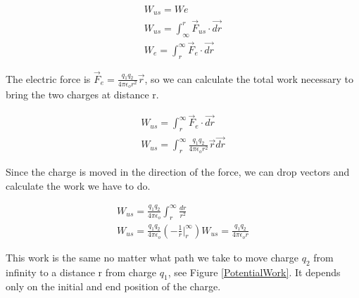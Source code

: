 \documentclass{ximera}
\begin{document}
\begin{eqnarray}
W_{us}=W{e} \\
W_{us}= \int_{\infty}^{r} \vec{F}_{us} \cdot \vec{dr} \\
W_{e}=  \int_{r}^{\infty} \vec{F}_{e} \cdot \vec{dr} 
\end{eqnarray}

The electric force is $\vec{F}_e=\frac{q_1 q_2}{4 \pi \epsilon_o r^2} \vec{r}$, so we can calculate the total work necessary to bring the two charges at distance r.

\begin{eqnarray}
W_{us}= \int_{r}^{\infty} \vec{F}_{e} \cdot \vec{dr} \\
W_{us}= \int_{r}^{\infty} \frac{q_1 q_2}{4 \pi \epsilon_o r^2} \vec{r} \vec{dr}
\end{eqnarray}

Since the charge is moved in the direction of the force, we can drop vectors and calculate the work we have to do.

\begin{eqnarray}
W_{us}= \frac{q_1 q_2}{4 \pi \epsilon_o} \int_{r}^{\infty} \frac{dr}{r^2} \\
W_{us}=  \frac{q_1 q_2}{4 \pi \epsilon_o} (-\frac{1}{r}\Big|_{r}^{\infty})
W_{us}=  \frac{q_1 q_2}{4 \pi \epsilon_o r} \label{WorkPoinCharge}
\end{eqnarray}

This work is the same no matter what path we take to move charge $q_2$ from infinity to a distance r from charge $q_1$, see Figure \ref{PotentialWork}. It depends only on the initial and end position of the charge.
\end{document}
